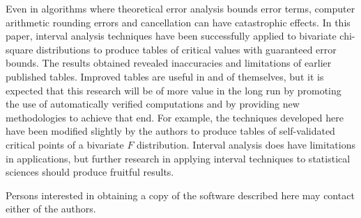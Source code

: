 Even in algorithms where theoretical error analysis bounds error terms,
computer arithmetic
rounding errors and cancellation can have catastrophic effects.
In this paper, interval analysis techniques have been successfully 
applied to bivariate chi-square distributions to produce tables of critical
values with guaranteed error bounds.  The results obtained revealed
inaccuracies and limitations of earlier published tables.
Improved tables are useful in and of themselves, but it is expected that this
research will be of more value in the long run by promoting the use of
automatically verified computations and by providing new methodologies to
achieve that end.  For example, the techniques developed here have been 
modified slightly  by the authors
to produce tables of self-validated critical points of a
bivariate $F$ distribution.
Interval analysis does have limitations in applications, but 
further research in applying interval techniques to statistical sciences
should produce fruitful results.  

Persons interested in obtaining a copy of the software described here may
contact either of the authors.

%
